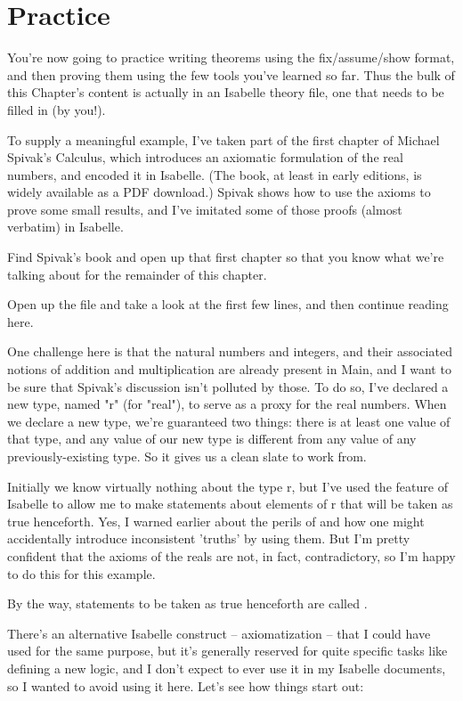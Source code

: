 \section{Practice}
You're now going to practice writing theorems using the fix/assume/show format, and then proving them using the few tools you've learned so far. Thus the bulk of this Chapter's content is actually in an Isabelle theory file, one that needs to be filled in (by you!). 

To supply a meaningful example, I've taken part of the first chapter of Michael Spivak's Calculus, which introduces an axiomatic formulation of the real numbers, and encoded it in Isabelle. (The book, at least in early editions, is widely available as a PDF download.) Spivak shows how to use the axioms to prove some small results, and I've imitated some of those proofs (almost verbatim) in Isabelle.

\task Find Spivak's book and open up that first chapter so that you know what we're talking about for the remainder of this chapter. 
\etask

Open up the  file and take a look at the first few lines, and then continue reading here.

One challenge here is that the natural numbers and integers, and their associated notions of addition and multiplication are already present in Main, and I want to be sure that Spivak's discussion isn't polluted by those. To do so, I've declared a new type, named "r" (for "real"), to serve as a proxy for the real numbers. When we declare a new type, we're guaranteed two things: there is at least one value of that type, and any value of our new type is different from any value of any previously-existing type. So it gives us a clean slate to work from. 

Initially we know virtually nothing about the type r, but I've used the  feature of Isabelle to allow me to make statements about elements of r that will be taken as true henceforth. Yes, I warned earlier about the perils of  and how one might accidentally introduce inconsistent 'truths' by using them. But I'm pretty confident that the axioms of the reals are not, in fact, contradictory, so I'm happy to do this for this example. 

By the way, statements to be taken as true henceforth are called . 

There's an alternative Isabelle construct -- axiomatization -- that I could have used for the same purpose, but it's generally reserved for quite specific tasks like defining a new logic, and I don't expect to ever use it in my Isabelle documents, so I wanted to avoid using it here. Let's see how things start out:


